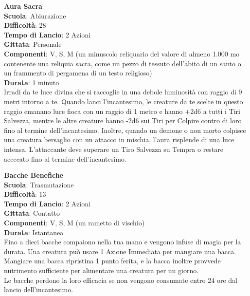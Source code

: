\begin{multicols}{2}
\medskip\textbf{Aura Sacra}\\
\textbf{Scuola}: Abiurazione\\
\textbf{Difficoltà}:  28\\
\textbf{Tempo di Lancio}: 2 Azioni\\
\textbf{Gittata}: Personale\\
\textbf{Componenti}: V, S, M (un minuscolo reliquario del valore di almeno 1.000 mo contenente una reliquia sacra, come un pezzo di tessuto dell'abito di un santo o un frammento di pergamena di un testo religioso)\\
\textbf{Durata}: 1 minuto\\
Irradi da te luce divina che si raccoglie in una debole luminosità con raggio di 9 metri intorno a te. Quando lanci l'incantesimo, le creature da te scelte in questo raggio emanano luce fioca con un raggio di 1 metro e hanno {+2d6} a tutti i Tiri Salvezza, mentre le altre creature hanno {-2d6} sui Tiri per Colpire contro di loro fino al termine dell'incantesimo. Inoltre, quando un demone o non morto colpisce una creatura bersaglio con un attacco in mischia, l’aura risplende di una luce intensa. L’attaccante deve superare un Tiro Salvezza su Tempra o restare accecato fino al termine dell'incantesimo.

\medskip\textbf{Bacche Benefiche}\\
\textbf{Scuola}: Trasmutazione\\
\textbf{Difficoltà}:  13\\
\textbf{Tempo di Lancio}: 2 Azioni\\
\textbf{Gittata}: Contatto\\
\textbf{Componenti}: V, S, M (un rametto di vischio)\\
\textbf{Durata}: Istantanea\\
Fino a dieci bacche compaiono nella tua mano e vengono infuse di magia per la durata. Una creatura può usare 1 Azione Immediata per mangiare una bacca. Mangiare una bacca ripristina 1 punto ferita, e la bacca inoltre provvede nutrimento sufficiente per alimentare una creatura per un giorno.\\
Le bacche perdono la loro efficacia se non vengono consumate entro 24 ore dal lancio dell'incantesimo. 


\end{multicols}
